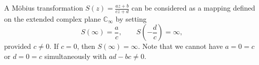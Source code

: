 A Möbius transformation $S(z) = \frac{az+b}{cz+d}$ can be considered as a mapping defined on the extended complex plane $\mathbb{C}_\infty$ by setting
$$S(\infty) = \frac{a}{c}, \qquad S\!\left(-\frac{d}{c}\right) = \infty,$$
provided $c \neq 0$. If $c = 0$, then $S(\infty) = \infty$. Note that we cannot have $a = 0 = c$ or $d = 0 = c$ simultaneously with $ad - bc \neq 0$.
